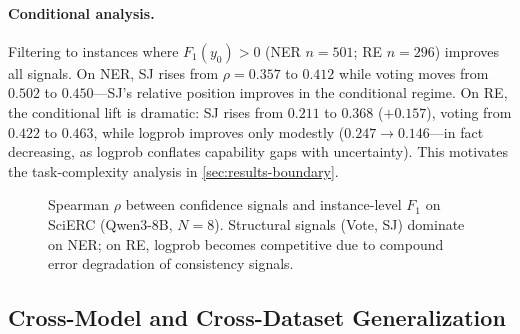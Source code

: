 \documentclass[11pt]{article}
\begin{document}
\paragraph{Conditional analysis.}
Filtering to instances where $F_1(y_0) > 0$ (NER $n{=}501$; RE $n{=}296$) improves all signals.
On NER, SJ rises from $\rho{=}0.357$ to $0.412$ while voting moves from $0.502$ to $0.450$---SJ's relative position improves in the conditional regime.
On RE, the conditional lift is dramatic: SJ rises from $0.211$ to $0.368$ ($+0.157$), voting from $0.422$ to $0.463$, while logprob improves only modestly ($0.247 \to 0.146$---in fact decreasing, as logprob conflates capability gaps with uncertainty).
This motivates the task-complexity analysis in \cref{sec:results-boundary}.

\begin{figure}[t]
\centering
{}
\caption{Spearman $\rho$ between confidence signals and instance-level $F_1$ on SciERC (Qwen3-8B, $N{=}8$). Structural signals (Vote, SJ) dominate on NER; on RE, logprob becomes competitive due to compound error degradation of consistency signals.}
\label{fig:rho-comparison}
\end{figure}

\subsection{Cross-Model and Cross-Dataset Generalization}
\label{sec:results-generalization}
\end{document}
